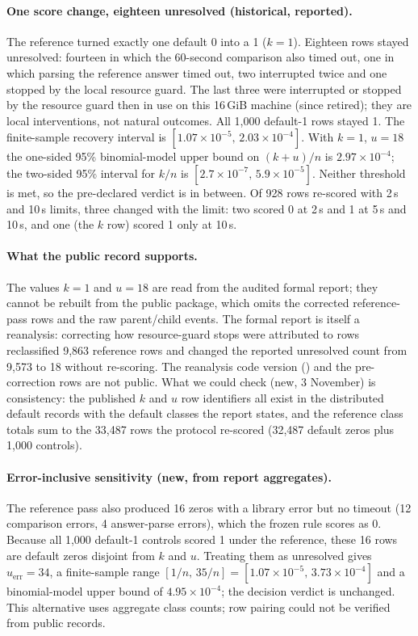 \documentclass[11pt,a4paper]{article}
\begin{document}
\paragraph{One score change, eighteen unresolved (historical, reported).} The reference turned exactly one default 0 into a 1 ($k=1$). Eighteen rows stayed unresolved: fourteen in which the 60-second comparison also timed out, one in which parsing the reference answer timed out, two interrupted twice and one stopped by the local resource guard. The last three were interrupted or stopped by the resource guard then in use on this 16\,GiB machine (since retired); they are local interventions, not natural outcomes. All 1,000 default-1 rows stayed 1. The finite-sample recovery interval is $[1.07\times10^{-5},\,2.03\times10^{-4}]$. With $k=1$, $u=18$ the one-sided 95\% binomial-model upper bound on $(k+u)/n$ is $2.97\times10^{-4}$; the two-sided 95\% interval for $k/n$ is $[2.7\times10^{-7},\,5.9\times10^{-5}]$. Neither threshold is met, so the pre-declared verdict is in between. Of 928 rows re-scored with 2\,s and 10\,s limits, three changed with the limit: two scored 0 at 2\,s and 1 at 5\,s and 10\,s, and one (the $k$ row) scored 1 only at 10\,s.

\paragraph{What the public record supports.} The values $k=1$ and $u=18$ are read from the audited formal report; they cannot be rebuilt from the public package, which omits the corrected reference-pass rows and the raw parent/child events. The formal report is itself a reanalysis: correcting how resource-guard stops were attributed to rows reclassified 9,863 reference rows and changed the reported unresolved count from 9,573 to 18 without re-scoring. The reanalysis code version () and the pre-correction rows are not public. What we could check (new, 3 November) is consistency: the published $k$ and $u$ row identifiers all exist in the distributed default records with the default classes the report states, and the reference class totals sum to the 33,487 rows the protocol re-scored (32,487 default zeros plus 1,000 controls).

\paragraph{Error-inclusive sensitivity (new, from report aggregates).} The reference pass also produced 16 zeros with a library error but no timeout (12 comparison errors, 4 answer-parse errors), which the frozen rule scores as 0. Because all 1,000 default-1 controls scored 1 under the reference, these 16 rows are default zeros disjoint from $k$ and $u$. Treating them as unresolved gives $u_{\text{err}}=34$, a finite-sample range $[1/n,\,35/n]=[1.07\times10^{-5},\,3.73\times10^{-4}]$ and a binomial-model upper bound of $4.95\times10^{-4}$; the decision verdict is unchanged. This alternative uses aggregate class counts; row pairing could not be verified from public records.
\end{document}
